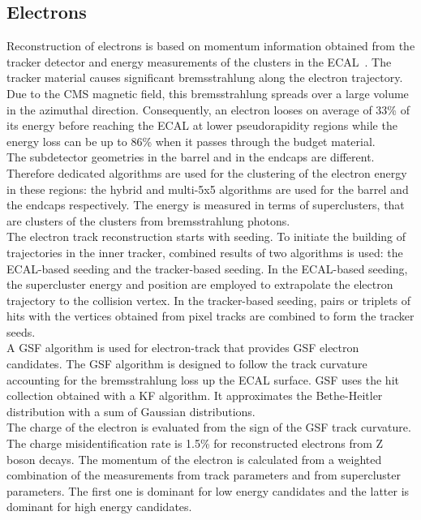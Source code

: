 \subsection{Electrons}
\label{sec:PFelectrons}
Reconstruction of electrons is based on momentum information obtained from the tracker detector and energy measurements of the clusters in the ECAL~\cite{ELEID}.
The tracker material causes significant bremsstrahlung along the electron trajectory. Due to the CMS magnetic field, this bremsstrahlung spreads over a large volume in the azimuthal direction. Consequently, an electron looses on average of 33\% of its energy before reaching the ECAL at lower pseudorapidity regions while the energy loss can be up to 86\% when it passes through the budget material.\\
The subdetector geometries in the barrel and in the endcaps are different. Therefore dedicated algorithms are used for the clustering of the electron energy in these regions: the hybrid and multi-5x5 algorithms are used for the barrel and the endcaps respectively. The energy is measured in terms of superclusters, that are clusters of the clusters from bremsstrahlung photons.\\
The electron track reconstruction starts with seeding. To initiate the building of trajectories in the inner tracker, combined results of two algorithms is used: the ECAL-based seeding and the tracker-based seeding. In the ECAL-based seeding, the supercluster energy and position are employed to extrapolate the electron trajectory to the collision vertex. In the tracker-based seeding, pairs or triplets of hits with the vertices obtained from pixel tracks are combined to form the tracker seeds.\\
A GSF algorithm is used for electron-track that provides GSF electron candidates. The GSF algorithm is designed to follow the track curvature accounting for the bremsstrahlung loss up the ECAL surface. GSF uses the hit collection obtained with a KF algorithm. It approximates the Bethe-Heitler distribution with a sum of Gaussian distributions. \\
The charge of the electron is evaluated from the sign of the GSF track curvature. The charge misidentification rate is 1.5\% for reconstructed electrons from Z boson decays. The momentum of the electron is calculated from a weighted combination of the measurements from track parameters and from supercluster parameters. The first one is dominant for low energy candidates and the latter is dominant for high energy candidates.\\
